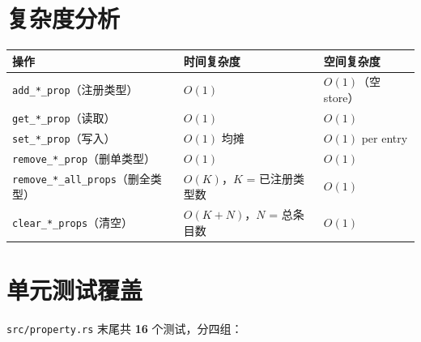 \documentclass[11pt,a4paper]{article}
\begin{document}
\section{复杂度分析}

\begin{center}
\renewcommand{\arraystretch}{1.20}
\begin{tabular}{@{}lll@{}}
  \toprule
  \textbf{操作} & \textbf{时间复杂度} & \textbf{空间复杂度} \\
  \midrule
  \texttt{add\_*\_prop}（注册类型）       & $O(1)$ & $O(1)$（空 store） \\
  \texttt{get\_*\_prop}（读取）            & $O(1)$ & $O(1)$ \\
  \texttt{set\_*\_prop}（写入）            & $O(1)$ 均摊 & $O(1)$ per entry \\
  \texttt{remove\_*\_prop}（删单类型）     & $O(1)$ & $O(1)$ \\
  \texttt{remove\_*\_all\_props}（删全类型） & $O(K)$，$K$ = 已注册类型数 & $O(1)$ \\
  \texttt{clear\_*\_props}（清空）         & $O(K + N)$，$N$ = 总条目数 & $O(1)$ \\
  \bottomrule
\end{tabular}
\end{center}

\section{单元测试覆盖}

\texttt{src/property.rs} 末尾共 \textbf{16} 个测试，分四组：
\end{document}
